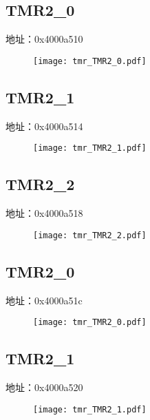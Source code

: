 \subsection{TMR2\_0}
\label{tmr-TMR2-0}
地址：0x4000a510
 \begin{figure}[H]
\texttt{[image: tmr\_TMR2\_0.pdf]}
\end{figure}

\subsection{TMR2\_1}
\label{tmr-TMR2-1}
地址：0x4000a514
 \begin{figure}[H]
\texttt{[image: tmr\_TMR2\_1.pdf]}
\end{figure}

\subsection{TMR2\_2}
\label{tmr-TMR2-2}
地址：0x4000a518
 \begin{figure}[H]
\texttt{[image: tmr\_TMR2\_2.pdf]}
\end{figure}

\subsection{TMR2\_0}
\label{tmr-TMR2-0}
地址：0x4000a51c
 \begin{figure}[H]
\texttt{[image: tmr\_TMR2\_0.pdf]}
\end{figure}

\subsection{TMR2\_1}
\label{tmr-TMR2-1}
地址：0x4000a520
 \begin{figure}[H]
\texttt{[image: tmr\_TMR2\_1.pdf]}
\end{figure}

